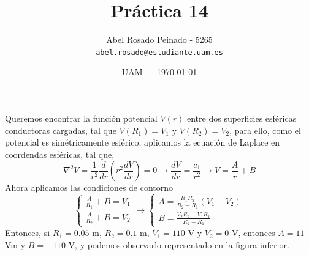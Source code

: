 \documentclass{article}
\title{Práctica 14} %
\author{Abel Rosado Peinado - 5265\\ \texttt{abel.rosado@estudiante.uam.es}} %
\date{UAM --- \today} %
\begin{document}
\maketitle %
\noindent Queremos encontrar la función potencial $V(r)$ entre dos superficies esféricas conductoras cargadas, tal que $V(R_1) = V_1$ y $V(R_2) = V_2$, para ello, como el potencial es simétricamente esférico, aplicamos la ecuación de Laplace en coordendas esféricas, tal que,
\[\nabla^2 V = \frac{1}{r^2} \frac{d}{dr}\left(r^2 \frac{d V}{dr}\right) = 0 \rightarrow \frac{d V}{dr} = \frac{c_1}{r^2} \rightarrow V = \frac{A}{r}+ B\]
Ahora aplicamos las condiciones de contorno
\[\left\{\begin{matrix}
	\frac{A}{R_1}+ B = V_1 \\ \frac{A}{R_2}+ B = V_2
\end{matrix}\right. \rightarrow \left\{\begin{matrix}
	A = \frac{R_1 R_2}{R_2-R_1}(V_1-V_2) \\ B = \frac{V_2 R_2 - V_1 R_1}{R_2-R_1} \phantom{---}
\end{matrix}\right.\] 
Entonces, si $R_1 = 0.05 $ m, $R_2 = 0.1$ m, $V_1 = 110$ V y $V_2 = 0$ V, entonces $A = 11 $ Vm y $B = -110$ V, y podemos observarlo representado en la figura inferior.
\end{document}
